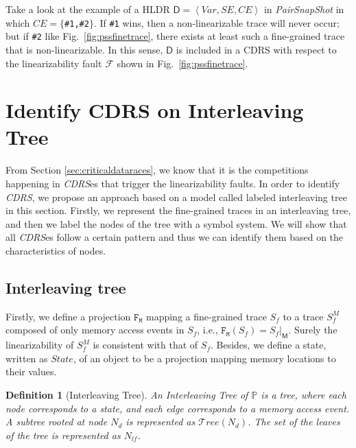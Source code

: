 \documentclass[runningheads]{llncs}
\newtheorem{myDef}{Definition}
\begin{document}
\begin{example} 

Take a look at the example of a HLDR $\mathsf{D}  = \left\langle \mathit{Var}, \mathit{SE}, \mathit{CE}\right\rangle$  in \textit{PairSnapShot} in which $\mathit{CE} = \{$\texttt{\#1,\#2}$\}$. If \texttt{\#1} wins, then a non-linearizable trace will never occur; but if \texttt{\#2} like Fig.~\ref{fig:pssfinetrace}, there exists at least such a fine-grained trace that is non-linearizable. In this sense,  $\mathsf{D}$ is included in a CDRS with respect to the linearizability fault $\mathcal{F}$ shown in Fig.~\ref{fig:pssfinetrace}.

\end{example}

\section{Identify CDRS on Interleaving Tree}\label{sec:intertree}
From Section \ref{sec:criticaldataraces}, we know that it is the competitions happening in \textit{CDRS}es that trigger the linearizability faults. In order to identify \textit{CDRS}, we propose an approach based on a model called labeled interleaving tree in this section. Firstly, we represent the fine-grained traces in an interleaving tree, and then we label the nodes of the tree with a symbol system. We will show that all \textit{CDRS}es follow a certain pattern and thus we can identify them based on the characteristics of nodes. 
\subsection{Interleaving tree}

Firstly, we define a projection $\mathtt{F_M}$ mapping a fine-grained trace $S_f$ to a trace $S^M_f$ composed of only memory access events in $S_f$, i.e., $\mathtt{F_M}(S_f) = S_f|_{\mathsf{M}}$. Surely the linearizability of $S^M_f$ is consistent with that of $S_f$.  Besides, we define a state, written as $\mathit{State}$, of an object to be a projection mapping memory locations to their values.

\begin{myDef}[Interleaving Tree]
    An \textit{Interleaving Tree} of $\mathbb{P}$ is a tree, where each node corresponds to a state, and each edge corresponds to a memory access event. A subtree rooted at node $N_d$ is represented as $\mathcal{T}ree(N_d)$. The set of the leaves of the tree is represented as $N_{lf}$.
\end{myDef}
\end{document}

